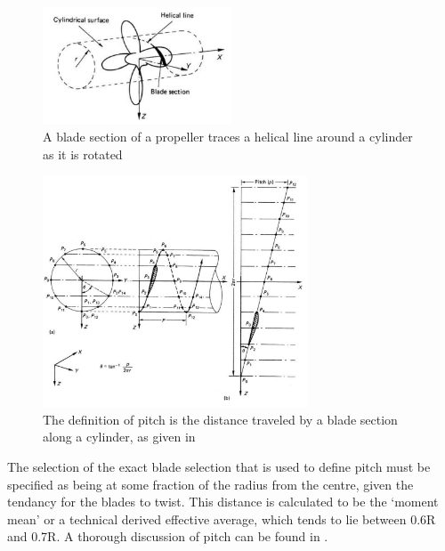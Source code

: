 \documentclass{article}\usepackage[]{graphicx}\usepackage[]{color}
\begin{document}
\begin{figure}[h]
\captionsetup{width=0.5\textwidth}
\includegraphics[width=0.5\textwidth, center]{HelicalLine.png}
\caption{A blade section of a propeller traces a helical line around a cylinder as it is rotated \parencite{carlton2007}}
\label{fig:HelicalLine.png}
\end{figure}

\begin{figure}[h]
\captionsetup{width=0.7\textwidth}
\includegraphics[width=0.7\textwidth, center]{PitchDefinition.png}
\caption{The definition of pitch is the distance traveled by a blade section along a cylinder, as given in \parencite{carlton2007}}
\label{fig:PitchDefinition.png}
\end{figure}

The selection of the exact blade selection that is used to define pitch must be specified as being at some fraction of the radius from the centre, given the tendancy for the blades to twist.  This distance is calculated to be the `moment mean' or a technical derived effective average, which tends to lie between 0.6R and 0.7R.  A thorough discussion of pitch can be found in \cite[35-37]{carlton2007}.
\end{document}
